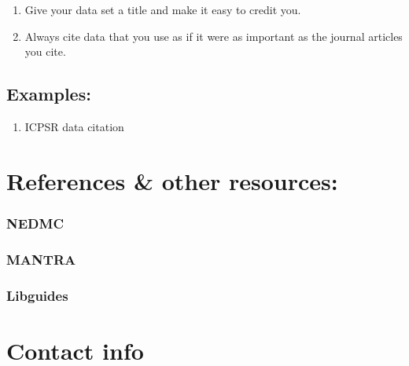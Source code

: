 \documentclass{tufte-handout}
\begin{document}
\begin{enumerate}
\def\labelenumi{\arabic{enumi}.}
\itemsep1pt\parskip0pt
\item
  Give your data set a title and make it easy to credit you.
\item
  Always cite data that you use as if it were as important as the
  journal articles you cite.
\end{enumerate}

\subsection{Examples:}\label{examples-1}

\begin{enumerate}
\def\labelenumi{\arabic{enumi}.}
\itemsep1pt\parskip0pt
\item
  ICPSR data citation
\end{enumerate}

\section{References \& other
resources:}\label{references-other-resources}

\subsubsection{NEDMC}\label{nedmc}

\subsubsection{MANTRA}\label{mantra}

\subsubsection{Libguides}\label{libguides}

\section{Contact info}\label{contact-info}
\end{document}
